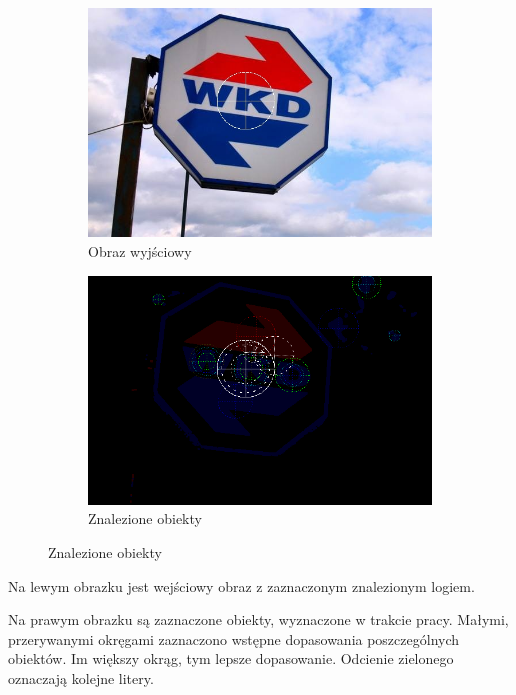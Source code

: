 \documentclass[a4paper,12pt]{article}
\begin{document}
		\begin{figure}[h]
			\centering
				\begin{subfigure}[b]{0.45\linewidth}
					\includegraphics[width=\linewidth]{raw.jpg}
					\caption{Obraz wyjściowy}
				\end{subfigure}
				\begin{subfigure}[b]{0.45\linewidth}
					\includegraphics[width=\linewidth]{output.png}
					\caption{Znalezione obiekty}
				\end{subfigure}
		\end{figure}
		Na lewym obrazku jest wejściowy obraz z zaznaczonym znalezionym logiem.
		
		Na prawym obrazku są zaznaczone obiekty, wyznaczone w trakcie pracy.
		Małymi, przerywanymi okręgami zaznaczono wstępne dopasowania poszczególnych obiektów.
		Im większy okrąg, tym lepsze dopasowanie.
		Odcienie zielonego oznaczają kolejne litery.
		
\end{document}

